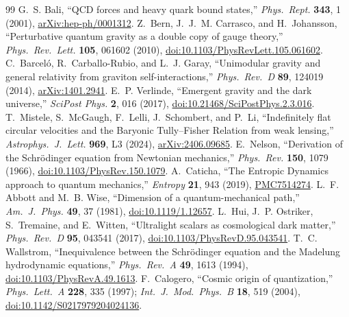 \documentclass[11pt,letterpaper]{article}
\begin{document}
\begin{thebibliography}{99}\footnotesize
\setlength{\itemsep}{2pt}
 G.~S. Bali, ``QCD forces and heavy quark bound states,'' \emph{Phys.\ Rept.} \textbf{343}, 1 (2001), \href{https://arxiv.org/pdf/hep-ph/0001312}{arXiv:hep-ph/0001312}.
 Z.~Bern, J.~J.~M. Carrasco, and H.~Johansson, ``Perturbative quantum gravity as a double copy of gauge theory,'' \emph{Phys.\ Rev.\ Lett.} \textbf{105}, 061602 (2010), \href{https://link.aps.org/doi/10.1103/PhysRevLett.105.061602}{doi:10.1103/PhysRevLett.105.061602}.
 C.~Barcel\'o, R.~Carballo-Rubio, and L.~J. Garay, ``Unimodular gravity and general relativity from graviton self-interactions,'' \emph{Phys.\ Rev.\ D} \textbf{89}, 124019 (2014), \href{https://arxiv.org/pdf/1401.2941}{arXiv:1401.2941}.
 E.~P. Verlinde, ``Emergent gravity and the dark universe,'' \emph{SciPost Phys.} \textbf{2}, 016 (2017), \href{https://scipost.org/SciPostPhys.2.3.016}{doi:10.21468/SciPostPhys.2.3.016}.
 T.~Mistele, S.~McGaugh, F.~Lelli, J.~Schombert, and P.~Li, ``Indefinitely flat circular velocities and the Baryonic Tully--Fisher Relation from weak lensing,'' \emph{Astrophys.\ J.\ Lett.} \textbf{969}, L3 (2024), \href{https://arxiv.org/abs/2406.09685}{arXiv:2406.09685}.
 E.~Nelson, ``Derivation of the Schr\"odinger equation from Newtonian mechanics,'' \emph{Phys.\ Rev.} \textbf{150}, 1079 (1966), \href{https://link.aps.org/doi/10.1103/PhysRev.150.1079}{doi:10.1103/PhysRev.150.1079}.
 A.~Caticha, ``The Entropic Dynamics approach to quantum mechanics,'' \emph{Entropy} \textbf{21}, 943 (2019), \href{https://pmc.ncbi.nlm.nih.gov/articles/PMC7514274/}{PMC7514274}.
 L.~F. Abbott and M.~B. Wise, ``Dimension of a quantum-mechanical path,'' \emph{Am.\ J.\ Phys.} \textbf{49}, 37 (1981), \href{https://pubs.aip.org/aapt/ajp/article/49/1/37/1051491/Dimension-of-a-quantum-mechanical-path}{doi:10.1119/1.12657}.
 L.~Hui, J.~P. Ostriker, S.~Tremaine, and E.~Witten, ``Ultralight scalars as cosmological dark matter,'' \emph{Phys.\ Rev.\ D} \textbf{95}, 043541 (2017), \href{https://link.aps.org/doi/10.1103/PhysRevD.95.043541}{doi:10.1103/PhysRevD.95.043541}.
 T.~C. Wallstrom, ``Inequivalence between the Schr\"odinger equation and the Madelung hydrodynamic equations,'' \emph{Phys.\ Rev.\ A} \textbf{49}, 1613 (1994), \href{https://link.aps.org/doi/10.1103/PhysRevA.49.1613}{doi:10.1103/PhysRevA.49.1613}.
 F.~Calogero, ``Cosmic origin of quantization,'' \emph{Phys.\ Lett.\ A} \textbf{228}, 335 (1997); \emph{Int.\ J.\ Mod.\ Phys.\ B} \textbf{18}, 519 (2004), \href{https://www.worldscientific.com/doi/abs/10.1142/S0217979204024136}{doi:10.1142/S0217979204024136}.

\end{thebibliography}
\end{document}
